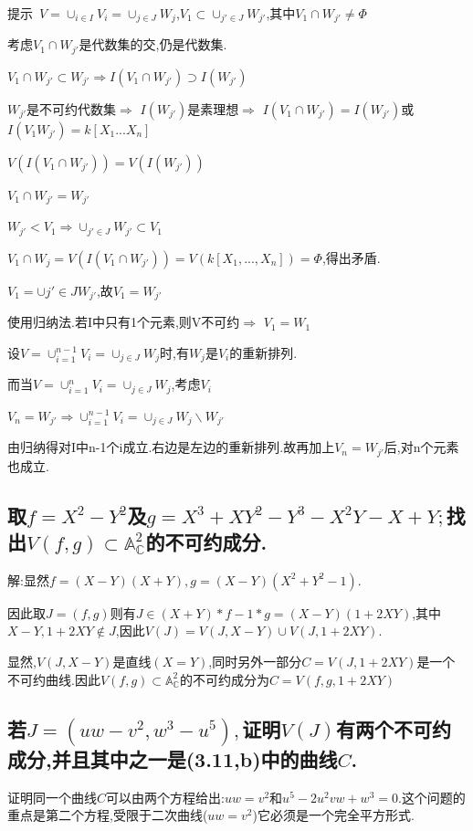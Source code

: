 \documentclass[UTF8]{book}
\begin{document}
	
	$\textbf{提示}$\ $V=\cup _{i\in I}V_{i}=\cup_{j\in J}W_{j}$,$V_{1}\subset \cup _{j'\in J}W_{j'}$,其中$V_{1}\cap W_{j'} \ne \Phi$
	
	
	考虑$V_{1}\cap W_{j'}$是代数集的交,仍是代数集.
	
	
	$V_{1}\cap W_{j'} \subset W_{j'} \Rightarrow I(V_{1}\cap W_{j'}) \supset I(W_{j'})$
	
	
	$W_{j'}$是不可约代数集$\Rightarrow$ $I(W_{j'})$是素理想$\Rightarrow$ $I(V_{1}\cap W_{j'})=I(W_{j'})$或$I(V_{1}W_{j'})=k[X_{1}...X_{n}]$
	
	
	$V(I(V_{1}\cap W_{j'}))=V(I(W_{j'}))$
	
	
	$V_{1}\cap W_{j'}=W_{j'}$
	
	
	$W_{j'}<V_{1} \Rightarrow \cup _{j'\in J}W_{j'} \subset V_{1}$
	
	
	$V_{1}\cap W_{j} =V(I(V_{1}\cap W_{j'}))=V(k[X_{1},...,X_{n}])=\Phi$,得出矛盾.
	
	
	$V_{1}=\cup {j'\in J} W_{j'}$,故$V_{1}=W_{j'}$
	
	
	使用归纳法.若I中只有1个元素,则V不可约$\Rightarrow$ $V_{1}=W_{1}$
	
	
	设$V=\cup_{i=1}^{n-1}V_{i}=\cup _{j\in J} W_{j}$时,有$W_{j}$是$V_{i}$的重新排列.
	
	
	而当$V=\cup_{i=1}^{n}V_{i}=\cup _{j\in J} W_{j}$,考虑$V_{i}$
	
	
	$V_{n}=W_{j'}\Rightarrow \cup_{i=1}^{n-1}V_{i}=\cup_{j\in J}W_{j} \backslash W_{j'}$
	
	
	由归纳得对I中n-1个i成立.右边是左边的重新排列.故再加上$V_{n}=W_{j'}$后,对n个元素也成立.
	
		\subsection{取$f=X^{2}-Y^{2}$及$g=X^{3}+X Y^{2}-Y^{3}-X^{2} Y-X+Y ;$找出$V ( f , g ) \subset \mathbb{A} ^{2}_\mathbb{C}$的不可约成分.}
	
	
	解:显然$ f = (X-Y)(X+Y) ,g = (X - Y) (X^{2} + Y^{2} - 1)$.
	
	
	因此取$ J = (f,g) $则有$ J \in (X+Y)*f - 1*g = (X - Y) (1 + 2 X Y) $,其中$ X-Y,1+2XY \notin J $,因此$ V(J) = V(J,X-Y) \cup V(J,1+2XY) $.
	
	
	显然,$ V(J,X-Y) $是直线$ (X = Y) $,同时另外一部分$ C = V(J,1+2XY) $是一个不可约曲线.因此$V ( f , g ) \subset \mathbb{A} ^{2}_\mathbb{C}$的不可约成分为$ C = V(f , g,1+2XY) $
	
	
	
	\subsection{若$J =\left( uw - v ^{2}, w ^{3}- u ^{5}\right),$证明$V ( J )$有两个不可约成分,并且其中之一是(3.11,b)中的曲线$ C $.}
	证明同一个曲线$ C $可以由两个方程给出:$u w=v^{2}$和$u^{5}- 2 u^{2} v w+w^{3}=0 .$这个问题的重点是第二个方程,受限于二次曲线($u w=v^{2}$)它必须是一个完全平方形式.
	
\end{document}
